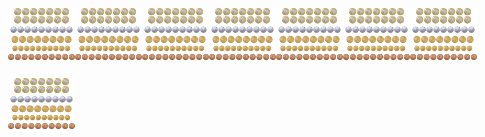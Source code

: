 \begin{escolha}
\begin{escolha}
{{{{\includegraphics[width=0.69797in,height=0.67970in]{media/image120.png}\includegraphics[width=0.69797in,height=0.67970in]{media/image120.png}\includegraphics[width=0.69797in,height=0.67970in]{media/image120.png}\includegraphics[width=0.69797in,height=0.67970in]{media/image120.png}\includegraphics[width=0.69797in,height=0.67970in]{media/image120.png}\includegraphics[width=0.69797in,height=0.67970in]{media/image120.png}\includegraphics[width=0.69797in,height=0.67970in]{media/image120.png}\includegraphics[width=0.69797in,height=0.67970in]{media/image120.png}

}}}}
\end{escolha}
\end{escolha}
